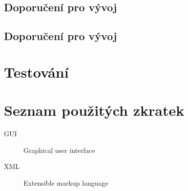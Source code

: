 \documentclass[thesis=M,czech]{FITthesis}[2012/06/26]
\begin{document}
\section{Doporučení pro vývoj}

\section{Doporučení pro vývoj}

\chapter{Testování}



\begin{conclusion}
\end{conclusion}




\appendix

\chapter{Seznam použitých zkratek}
\begin{description}
	\item[GUI] Graphical user interface
	\item[XML] Extensible markup language
\end{description}
\end{document}
